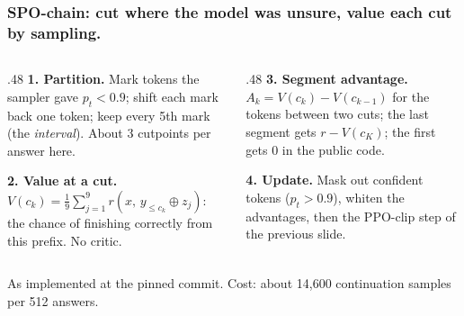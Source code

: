 \documentclass[aspectratio=169,11pt]{beamer}
\newcommand{\source}[1]{\vfill{\scriptsize\color{Gray}#1\par}}
\begin{document}
\begin{frame}[t]
\frametitle{SPO-chain: cut where the model was unsure, value each cut by sampling.}
\begin{center}
\end{center}
\small
\begin{columns}[T,onlytextwidth]
\begin{column}{.48\textwidth}
\textbf{1. Partition.} Mark tokens the sampler gave $p_t<0.9$; shift each mark back one
token; keep every 5th mark (the \emph{interval}). About 3 cutpoints per answer here.
\medskip

\textbf{2. Value at a cut.} $V(c_k)=\frac19\sum_{j=1}^{9} r(x,\,y_{\le c_k}\oplus z_j)$:
the chance of finishing correctly from this prefix. No critic.
\end{column}
\begin{column}{.48\textwidth}
\textbf{3. Segment advantage.} $A_k=V(c_k)-V(c_{k-1})$ for the tokens between two cuts;
the last segment gets $r-V(c_K)$; the first gets 0 in the public code.
\medskip

\textbf{4. Update.} Mask out confident tokens ($p_t>0.9$), whiten the advantages, then the
PPO-clip step of the previous slide.
\end{column}
\end{columns}
\source{As implemented at the pinned commit. Cost: about 14,600 continuation samples per 512 answers.}
\end{frame}
\end{document}
